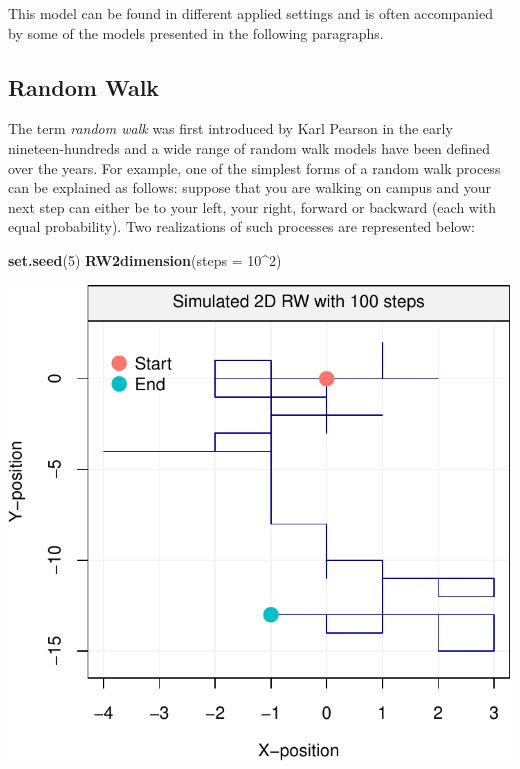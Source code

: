 \documentclass[]{book}
\newenvironment{Shaded}{\begin{snugshade}}{\end{snugshade}}
\newcommand{\DataTypeTok}[1]{\textcolor[rgb]{0.13,0.29,0.53}{#1}}
\newcommand{\DecValTok}[1]{\textcolor[rgb]{0.00,0.00,0.81}{#1}}
\newcommand{\KeywordTok}[1]{\textcolor[rgb]{0.13,0.29,0.53}{\textbf{#1}}}
\newcommand{\NormalTok}[1]{#1}
\newcommand{\OperatorTok}[1]{\textcolor[rgb]{0.81,0.36,0.00}{\textbf{#1}}}
\theoremstyle{definition}
\theoremstyle{definition}
\theoremstyle{definition}
\theoremstyle{remark}
\begin{document}
This model can be found in different applied settings and is often
accompanied by some of the models presented in the following paragraphs.

\hypertarget{rw}{%
\subsection{Random Walk}\label{rw}}

The term \emph{random walk} was first introduced by Karl Pearson in the
early nineteen-hundreds and a wide range of random walk models have been
defined over the years. For example, one of the simplest forms of a
random walk process can be explained as follows: suppose that you are
walking on campus and your next step can either be to your left, your
right, forward or backward (each with equal probability). Two
realizations of such processes are represented below:

\begin{Shaded}
\begin{Highlighting}[]
\KeywordTok{set.seed}\NormalTok{(}\DecValTok{5}\NormalTok{)}
\KeywordTok{RW2dimension}\NormalTok{(}\DataTypeTok{steps =} \DecValTok{10}\OperatorTok{^}\DecValTok{2}\NormalTok{)}
\end{Highlighting}
\end{Shaded}

\begin{center}\includegraphics{ts_files/figure-latex/RW2d-1} \end{center}
\end{document}
